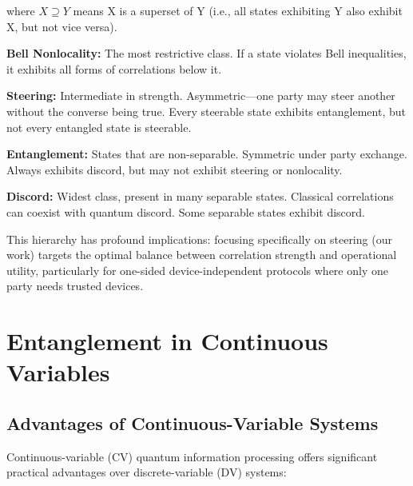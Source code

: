 where $X \supseteq Y$ means X is a superset of Y (i.e., all states exhibiting Y also exhibit X, but not vice versa).

\textbf{Bell Nonlocality:} The most restrictive class. If a state violates Bell inequalities, it exhibits all forms of correlations below it.

\textbf{Steering:} Intermediate in strength. Asymmetric—one party may steer another without the converse being true. Every steerable state exhibits entanglement, but not every entangled state is steerable.

\textbf{Entanglement:} States that are non-separable. Symmetric under party exchange. Always exhibits discord, but may not exhibit steering or nonlocality.

\textbf{Discord:} Widest class, present in many separable states. Classical correlations can coexist with quantum discord. Some separable states exhibit discord.

This hierarchy has profound implications: focusing specifically on steering (our work) targets the optimal balance between correlation strength and operational utility, particularly for one-sided device-independent protocols where only one party needs trusted devices.

\section{Entanglement in Continuous Variables}

\subsection{Advantages of Continuous-Variable Systems}

Continuous-variable (CV) quantum information processing offers significant practical advantages over discrete-variable (DV) systems:

